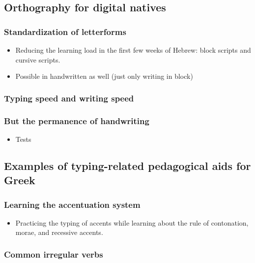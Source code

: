 \documentclass[11pt]{article}
\begin{document}
\subsection{Orthography for digital natives}
\label{sec:org1d25c83}

\subsubsection{Standardization of letterforms}
\label{sec:org984b595}

\begin{itemize}
\item Reducing the learning load in the first few weeks of Hebrew: block scripts and cursive scripts.
\item Possible in handwritten as well (just only writing in block)
\end{itemize}

\subsubsection{Typing speed and writing speed}
\label{sec:org7d37a19}

\subsubsection{But the permanence of handwriting}
\label{sec:org686e75b}

\begin{itemize}
\item Tests
\end{itemize}

\subsection{Examples of typing-related pedagogical aids for Greek}
\label{sec:orgaff0b84}

\subsubsection{Learning the accentuation system}
\label{sec:org1f735b2}

\begin{itemize}
\item Practicing the typing of accents while learning about the rule of contonation, morae, and recessive accents.
\end{itemize}

\subsubsection{Common irregular verbs}
\label{sec:org2cd60a5}
\end{document}

